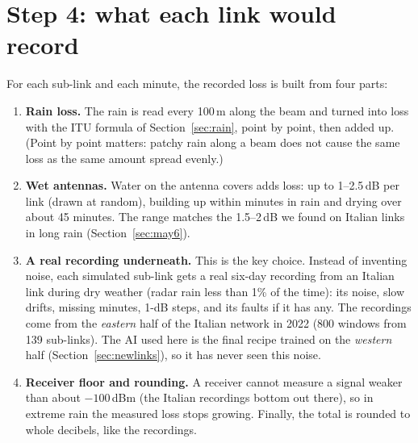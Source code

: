 \section{Step 4: what each link would record}
\label{sec:p4_signal}
For each sub-link and each minute, the recorded loss is built from four parts:
\begin{enumerate}
\item \textbf{Rain loss.} The rain is read every 100\,m along the beam and turned into loss with the ITU formula of
Section~\ref{sec:rain}, point by point, then added up. (Point by point matters: patchy rain along a beam does not cause the
same loss as the same amount spread evenly.)
\item \textbf{Wet antennas.} Water on the antenna covers adds loss: up to 1--2.5\,dB per link (drawn at random), building
up within minutes in rain and drying over about 45 minutes. The range matches the 1.5--2\,dB we found on Italian links in
long rain (Section~\ref{sec:may6}).
\item \textbf{A real recording underneath.} This is the key choice. Instead of inventing noise, each simulated sub-link
gets a real six-day recording from an Italian link during dry weather (radar rain less than 1\% of the time): its
noise, slow drifts, missing minutes, 1-dB steps, and its faults if it has any. The recordings come from the
\emph{eastern} half of the Italian network in 2022 (800 windows from 139 sub-links). The AI used here is the final recipe
trained on the \emph{western} half (Section~\ref{sec:newlinks}), so it has never seen this noise.
\item \textbf{Receiver floor and rounding.} A receiver cannot measure a signal weaker than about $-100$\,dBm (the Italian
recordings bottom out there), so in extreme rain the measured loss stops growing. Finally, the total is rounded to whole
decibels, like the recordings.
\end{enumerate}

